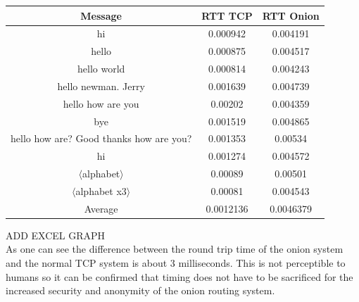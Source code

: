 \documentclass[10pt]{report}
\begin{document}
\begin{center}
    \begin{tabular}{|c|c|c|}
    \hline
    Message & RTT TCP & RTT Onion \\
    \hline
    hi & 0.000942 &    0.004191 \\
    hello &    0.000875 & 0.004517 \\
    hello world & 0.000814 & 0.004243 \\
    hello newman. Jerry & 0.001639 & 0.004739 \\
    hello how are you & 0.00202 & 0.004359 \\
    bye & 0.001519 & 0.004865 \\
    hello how are? Good thanks how are you? & 0.001353 & 0.00534 \\
    hi & 0.001274 & 0.004572 \\
    $\langle$alphabet$\rangle$ & 0.00089 & 0.00501 \\
    $\langle$alphabet x3$\rangle$ & 0.00081 & 0.004543 \\
    \hline
    Average & 0.0012136 & 0.0046379 \\
    \hline
    \end{tabular}
\end{center}
ADD EXCEL GRAPH\\
As one can see the difference between the round trip time of the onion system and the normal TCP system is about 3 milliseconds. This is not perceptible to humans so it can be confirmed that timing does not have to be sacrificed for the increased security and anonymity of the onion routing system.
\end{document}
